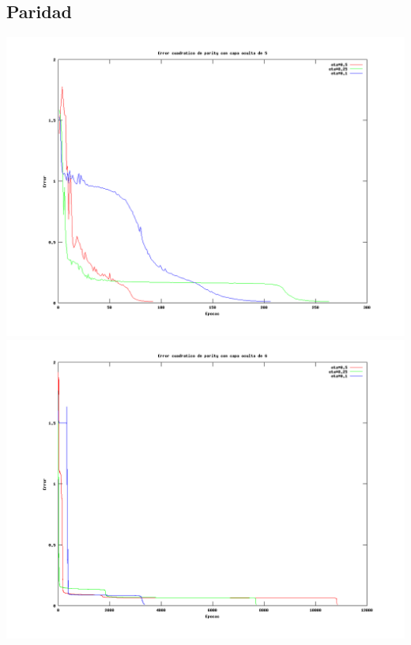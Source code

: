 \documentclass{article}
\begin{document}
\subsection{Paridad}
\begin{center}
 \includegraphics[scale=0.35]{../../doc/results/cuadErrorparity_l5.png}
 \includegraphics[scale=0.35]{../../doc/results/cuadErrorparity_l6.png}

\end{center}
\end{document}
